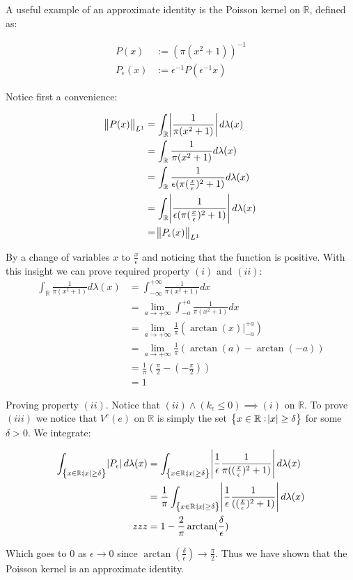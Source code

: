 \begin{example}

A useful example of an approximate identity is the Poisson kernel on $\mathbb{R}$, defined as:

\begin{align*}
P(x) &:= (\pi(x^2+1))^{-1} \\
P_\epsilon(x) &:= \epsilon^{-1}P(\epsilon^{-1}x)
\end{align*}

Notice first a convenience:

\begin{align*}
\norm{P(x)}_{L^1} &= \int_\mathbb{R} \abs{\frac{1}{ \pi (x^2+1)} } d\lambda(x) \\
&= \int_\mathbb{R} \frac{1}{ \pi (x^2+1)} d\lambda(x) \\
&= \int_\mathbb{R} \frac{1}{\epsilon(\pi (\frac{x}{\epsilon})^2+1)} d\lambda(x)\\
&= \int_\mathbb{R} \abs{ \frac{1}{\epsilon(\pi (\frac{x}{\epsilon})^2+1)}} d\lambda(x)\\
&= \norm{P_\epsilon(x)}_{L^1}
\end{align*}

By a change of variables $x$ to $\frac{x}{\epsilon}$ and noticing that the function is positive. With this insight we can prove required property $(i)$ and $(ii)$:
\begin{align*}
\int_\mathbb{R} \frac{1}{\pi(x^2+1)} d\lambda(x) &= \int_{-\infty}^{+\infty} \frac{1}{\pi(x^2+1)} dx \\
&= \lim_{a\to +\infty} \int_{-a}^{+a} \frac{1}{\pi(x^2+1)} dx \\
&= \lim_{a\to +\infty} \frac{1}{\pi}( \arctan(x) \vert_{-a}^{+a}) \\
&= \lim_{a\to +\infty} \frac{1}{\pi} (\arctan(a) - \arctan(-a)) \\
&= \frac{1}{\pi} (\frac{\pi}{2} - (- \frac{\pi}{2})) \\
&= 1
\end{align*}

Proving property $(ii)$. Notice that $(ii) \wedge (k_\epsilon \leq 0) \implies (i)$ on $\mathbb{R}$. To prove $(iii)$ we notice that $V^c(e)$ on $\mathbb{R}$ is simply the set $\cbr{ x \in \mathbb{R} : \abs{x} \geq \delta}$ for some $\delta > 0$. We integrate:

\begin{align*}
\int_{\cbr{ x \in \mathbb{R} : \abs{x} \geq \delta}} \abs{P_\epsilon} d\lambda(x) &= \int_{\cbr{ x \in \mathbb{R} : \abs{x} \geq \delta}} \abs{\frac{1}{\epsilon}\frac{1}{\pi((\frac{x}{\epsilon})^2+1)}} d\lambda(x) \\
&= \frac{1}{\pi} \int_{\cbr{ x \in \mathbb{R} : \abs{x} \geq \delta}} \abs{\frac{1}{\epsilon}\frac{1}{((\frac{x}{\epsilon})^2+1)}} d\lambda(x)\\
zzz
&= 1 - \frac{2}{\pi} \arctan(\frac{\delta}{\epsilon})
\end{align*}

Which goes to $0$ as $\epsilon \to 0$ since $\arctan(\frac{\delta}{\epsilon}) \to \frac{\pi}{2}$. Thus we have shown that the Poisson kernel is an approximate identity.

\end{example}

